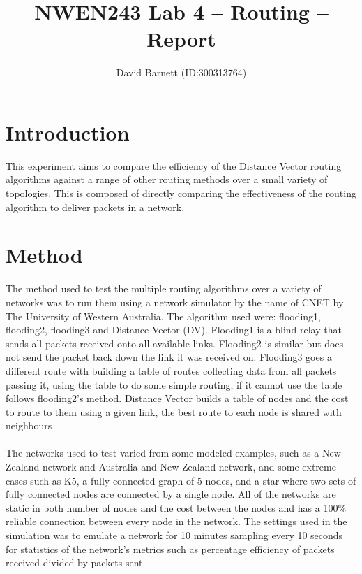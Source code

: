 \documentclass[11pt]{article}
\author{David Barnett (ID:300313764)}
\title{NWEN243 Lab 4 -- Routing -- Report}
\date{}
\begin{document}
\maketitle


\section*{Introduction}

This experiment aims to compare the efficiency of the Distance Vector
routing algorithms against a range of other routing methods over a small
variety of topologies. This is composed of directly comparing the effectiveness
of the routing algorithm to deliver packets in a network.

\section*{Method}

The method used to test the multiple routing algorithms over a variety of
networks was to run them using a network simulator by the name of CNET by
The University of Western Australia. The algorithm used were: flooding1, flooding2,
flooding3  and Distance Vector (DV). Flooding1 is a blind relay that sends
all packets received onto all available links. Flooding2 is similar but does
not send the packet back down the link it was received on. Flooding3 goes a
different route with building a table of routes collecting data from all packets
passing it, using the table to do some simple routing, if it cannot use the table
follows flooding2's method. Distance Vector builds a table of nodes and the cost
to route to them using a given link, the best route to each node is shared with neighbours

\paragraph{}
The networks used to test varied from some modeled examples, such as a New Zealand
network and Australia and New Zealand network, and some extreme cases such as
K5, a fully connected graph of 5 nodes, and a star where two sets of fully
connected nodes are connected by a single node. All of the networks are
static in both number of nodes and the cost between the nodes and has a 100\%
reliable connection between every node in the network. The settings used in the
simulation was to emulate a network for 10 minutes sampling every 10 seconds
for statistics of the network's metrics such as percentage efficiency of packets
received divided by packets sent.
\end{document}
